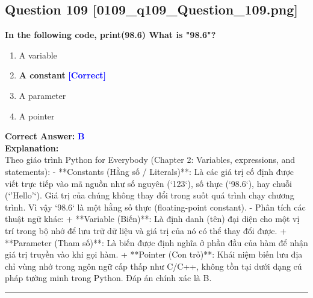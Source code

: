 \documentclass[11pt,a4paper]{article}
\begin{document}
\begin{minipage}{\textwidth}
\subsection*{Question 109 \quad \footnotesize{[0109_q109_Question_109.png]}}
\noindent \textbf{In the following code, print(98.6) What is "98.6"?}

\begin{enumerate}[label=\Alph*.]
    \item A variable
    \item \textbf{A constant} \hfill \textcolor{blue}{\textbf{[Correct]}}
    \item A parameter
    \item A pointer
\end{enumerate}

\noindent \textbf{Correct Answer:} \textcolor{blue}{\textbf{B}} \\[4pt]
\noindent \textbf{Explanation:}\\
Theo giáo trình Python for Everybody (Chapter 2: Variables, expressions, and statements):\newline
- **Constants (Hằng số / Literals)**: Là các giá trị cố định được viết trực tiếp vào mã nguồn như số nguyên (`123`), số thực (`98.6`), hay chuỗi (`'Hello'`). Giá trị của chúng không thay đổi trong suốt quá trình chạy chương trình. Vì vậy `98.6` là một hằng số thực (floating-point constant).\newline
- Phân tích các thuật ngữ khác:\newline
  + **Variable (Biến)**: Là định danh (tên) đại diện cho một vị trí trong bộ nhớ để lưu trữ dữ liệu và giá trị của nó có thể thay đổi được.\newline
  + **Parameter (Tham số)**: Là biến được định nghĩa ở phần đầu của hàm để nhận giá trị truyền vào khi gọi hàm.\newline
  + **Pointer (Con trỏ)**: Khái niệm biến lưu địa chỉ vùng nhớ trong ngôn ngữ cấp thấp như C/C++, không tồn tại dưới dạng cú pháp tường minh trong Python.\newline
Đáp án chính xác là B.
\end{minipage}
\vspace{0.8cm}
\hrule
\vspace{0.5cm}
\end{document}
